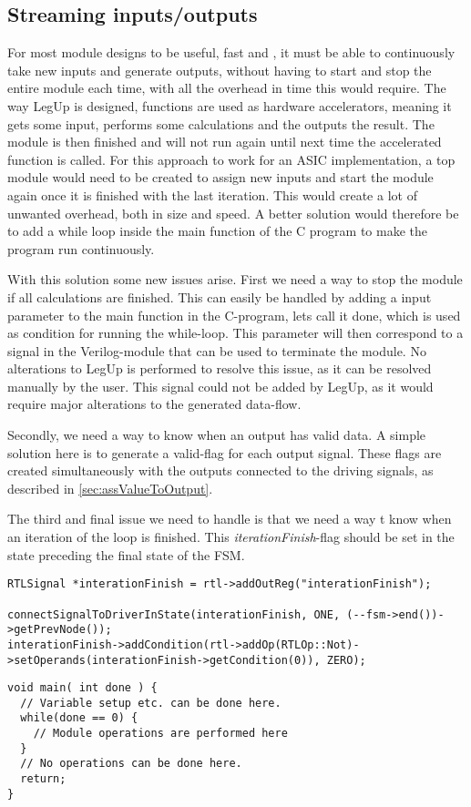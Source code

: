\subsection{Streaming inputs/outputs}
For most module designs to be useful, fast and , it must be able to continuously take new inputs and generate outputs, without having to start and stop the entire module each time, with all the overhead in time this would require. The way LegUp is designed, functions are used as hardware accelerators, meaning it gets some input, performs some calculations and the outputs the result. The module is then finished and will not run again until next time the accelerated function is called. For this approach to work for an ASIC implementation, a top module would need to be created to assign new inputs and start the module again once it is finished with the last iteration. This would create a lot of unwanted overhead, both in size and speed. A better solution would therefore be to add a while loop inside the main function of the C program to make the program run continuously.

With this solution some new issues arise. 
First we need a way to stop the module if all calculations are finished. This can easily be handled by adding a input parameter to the main function in the C-program, lets call it done, which is used as condition for running the while-loop. This parameter will then correspond to a signal in the Verilog-module that can be used to terminate the module. No alterations to LegUp is performed to resolve this issue, as it can be resolved manually by the user. This signal could not be added by LegUp, as it would require major alterations to the generated data-flow.

Secondly, we need a way to know when an output has valid data. A simple solution here is to generate a valid-flag for each output signal. These flags are created simultaneously with the outputs connected to the driving signals, as described in \ref{sec:assValueToOutput}.

The third and final issue we need to handle is that we need a way t know when an iteration of the loop is finished. This \textit{iterationFinish}-flag should be set in the state preceding the final state of the FSM.
\lstset{language=C,style=Cstyle}
\begin{lstlisting}
RTLSignal *interationFinish = rtl->addOutReg("interationFinish");

connectSignalToDriverInState(interationFinish, ONE, (--fsm->end())->getPrevNode());
interationFinish->addCondition(rtl->addOp(RTLOp::Not)->setOperands(interationFinish->getCondition(0)), ZERO);
\end{lstlisting}
\begin{lstlisting}[caption={FIR-filter implemented in C},label=lst:firfilterc]
void main( int done ) {
  // Variable setup etc. can be done here.
  while(done == 0) {
    // Module operations are performed here
  }
  // No operations can be done here.
  return;
}
\end{lstlisting}

